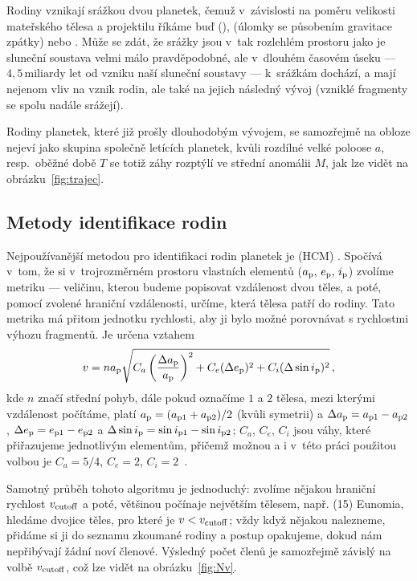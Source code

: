 \documentclass[A4paper, 12pt, oneside]{book}
\begin{document}
Rodiny vznikají srážkou dvou planetek, čemuž v~závislosti na poměru velikosti mateřského tělesa a projektilu říkáme buď  (),  (úlomky se působením gravitace  zpátky) nebo . Může se zdát, že srážky jsou v~tak rozlehlém prostoru jako je sluneční soustava velmi málo pravděpodobné, ale v~dlouhém časovém úseku --- $4,5\,\text{miliardy let}$ od vzniku naší sluneční soustavy --- k~srážkám dochází, a mají nejenom vliv na vznik rodin, ale také na jejich následný vývoj (vzniklé fragmenty se spolu nadále srážejí).

Rodiny planetek, které již prošly dlouhodobým vývojem, se samozřejmě na obloze nejeví jako skupina společně letících planetek, kvůli rozdílné velké poloose $a$, resp.\ oběžné době $T$ se totiž záhy rozptýlí ve střední anomálii $M$, jak lze vidět na obrázku~\ref{fig:trajec}.

\subsection{Metody identifikace rodin} \label{sec:metodyiden}
Nejpoužívanější metodou pro identifikaci rodin planetek je  (HCM) \cite{zappala90}. Spočívá v~tom, že si v~trojrozměrném prostoru vlastních elementů ($a_{\rm p},\,e_{\rm p},\,i_{\rm p}$) zvolíme metriku --- veličinu, kterou budeme popisovat vzdálenost dvou těles, a poté, pomocí zvolené hraniční  vzdálenosti, určíme, která tělesa patří do rodiny. Tato metrika má přitom jednotku rychlosti, aby ji bylo možné porovnávat s rychlostmi výhozu fragmentů. Je určena vztahem
\begin{align}
	v=na_{\rm p}\sqrt{C_a\left(\frac{\Delta a_{\rm p}}{a_{\rm p}}\right)^2+C_e(\Delta e_{\rm p})^2+C_i(\Delta \sin i_{\rm p})^2}\,,
\end{align}
kde $n$ značí střední pohyb, dále pokud označíme $1$ a $2$ tělesa, mezi kterými vzdálenost počítáme, platí $a_{\rm p}=(a_{{\rm p}1}+a_{{\rm p}2})/2$ (kvůli symetrii) a $\Delta a_{\rm p}=a_{{\rm p}1}-a_{{\rm p}2}$, $\Delta e_{\rm p}=e_{{\rm p}1}-e_{{\rm p}2}$ a $\Delta \sin i_{\rm p}=\sin i_{{\rm p}1}-\sin i_{{\rm p}2}$; $C_a,\,C_e,\,C_i$ jsou váhy, které přiřazujeme jednotlivým elementům, přičemž možnou a i v~této práci použitou volbou je $C_a=5/4$, $C_e=2$, $C_i=2$~\cite{zappala90}. 

Samotný průběh tohoto algoritmu je jednoduchý: zvolíme nějakou hraniční rychlost $v_{\rm cutoff}$ a poté, většinou počínaje největším tělesem, např. (15) Eunomia, hledáme dvojice těles, pro které je $v<v_{\rm cutoff}$; vždy když nějakou nalezneme, přidáme si ji do seznamu zkoumané rodiny a postup opakujeme, dokud nám nepřibývají žádní noví členové. Výsledný počet členů je samozřejmě závislý na volbě $v_{\rm cutoff}$, což lze vidět na obrázku~\ref{fig:Nv}.
\end{document}
